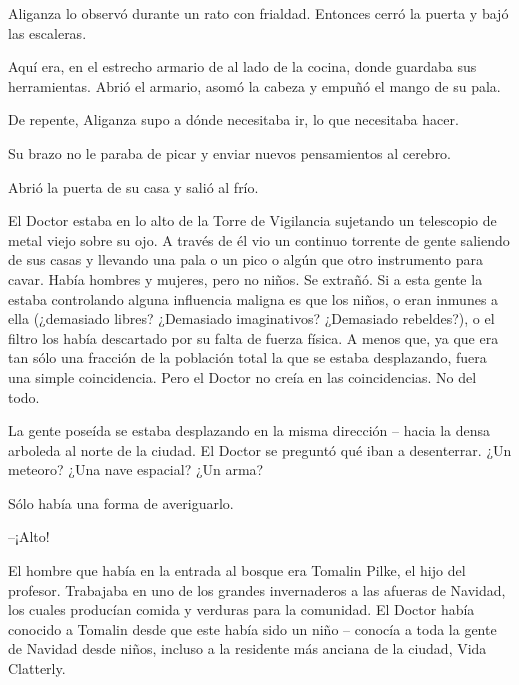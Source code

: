 Aliganza lo observó durante un rato con frialdad. Entonces cerró la puerta y bajó las escaleras.

Aquí era, en el estrecho armario de al lado de la cocina, donde guardaba sus herramientas. Abrió el armario, asomó la cabeza y empuñó el mango de su pala.

De repente, Aliganza supo a dónde necesitaba ir, lo que necesitaba hacer.

Su brazo no le paraba de picar y enviar nuevos pensamientos al cerebro.

Abrió la puerta de su casa y salió al frío.



\mbox{}



\centerline{ \Huge *}



\mbox{}



El Doctor estaba en lo alto de la Torre de Vigilancia sujetando un telescopio de metal viejo sobre su ojo. A través de él vio un continuo torrente de gente saliendo de sus casas y llevando una pala o un pico o algún que otro instrumento para cavar. Había hombres y mujeres, pero no niños. Se extrañó. Si a esta gente la estaba controlando alguna influencia maligna es que los niños, o eran inmunes a ella (¿demasiado libres? ¿Demasiado imaginativos? ¿Demasiado rebeldes?), o el filtro los había descartado por su falta de fuerza física. A menos que, ya que era tan sólo una fracción de la población total la que se estaba desplazando, fuera una simple coincidencia. Pero el Doctor no creía en las coincidencias. No del todo.

La gente poseída se estaba desplazando en la misma dirección – hacia la densa arboleda al norte de la ciudad. El Doctor se preguntó qué iban a desenterrar. ¿Un meteoro? ¿Una nave espacial? ¿Un arma? 

Sólo había una forma de averiguarlo.



\mbox{}



\centerline{ \Huge *}



\mbox{}



--¡Alto!

El hombre que había en la entrada al bosque era Tomalin Pilke, el hijo del profesor. Trabajaba en uno de los grandes invernaderos a las afueras de Navidad, los cuales producían comida y verduras para la comunidad. El Doctor había conocido a Tomalin desde que este había sido un niño – conocía a toda la gente de Navidad desde niños, incluso a la residente más anciana de la ciudad, Vida Clatterly.

